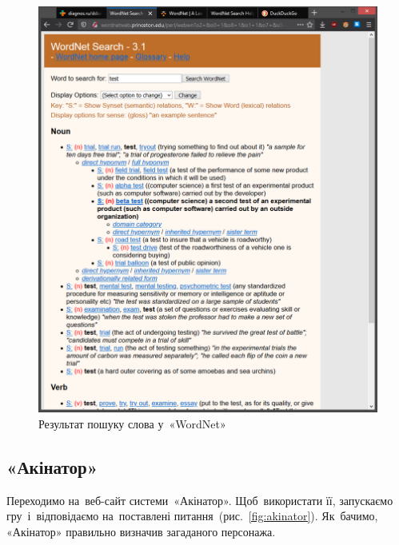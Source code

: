 \documentclass[
  a4paper,
  oneside,
  BCOR = 10mm,
  DIV = 12,
  12pt,
  headings = normal,
]{scrartcl}
\newlength{\gridunitwidth}
\begin{document}
      \begin{figure}[!htbp]
        \centering
        \includegraphics[width = 8 \gridunitwidth]{./assets/11.png}
        \caption{Результат пошуку слова у~«\textenglish{WordNet}»}
        \label{fig:wordnet}
      \end{figure}

    \subsection{«Акінатор»}
      Переходимо на~веб-сайт системи~«Акінатор». Щоб~використати її, запускаємо гру~і~відповідаємо на~поставлені питання~(рис.~\ref{fig:akinator}). Як~бачимо, «Акінатор» правильно визначив загаданого персонажа.
\end{document}

